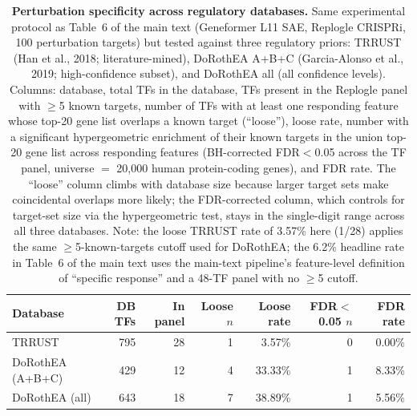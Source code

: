 \documentclass[onecolumn]{article}
\begin{document}
\begin{table}[H]
\centering
\caption{\textbf{Perturbation specificity across regulatory databases.} Same experimental protocol as Table~6 of the main text (Geneformer L11 SAE, Replogle CRISPRi, 100 perturbation targets) but tested against three regulatory priors: TRRUST (Han et al., 2018; literature-mined), DoRothEA A+B+C (Garcia-Alonso et al., 2019; high-confidence subset), and DoRothEA all (all confidence levels). Columns: database, total TFs in the database, TFs present in the Replogle panel with $\geq$5 known targets, number of TFs with at least one responding feature whose top-20 gene list overlaps a known target (``loose''), loose rate, number with a significant hypergeometric enrichment of their known targets in the union top-20 gene list across responding features (BH-corrected FDR$<$0.05 across the TF panel, universe $=$ 20,000 human protein-coding genes), and FDR rate. The ``loose'' column climbs with database size because larger target sets make coincidental overlaps more likely; the FDR-corrected column, which controls for target-set size via the hypergeometric test, stays in the single-digit range across all three databases. Note: the loose TRRUST rate of 3.57\% here (1/28) applies the same $\geq$5-known-targets cutoff used for DoRothEA; the 6.2\% headline rate in Table~6 of the main text uses the main-text pipeline's feature-level definition of ``specific response'' and a 48-TF panel with no $\geq$5 cutoff.}
\label{tab:regulatory_dbs}
\smallskip
\small
\begin{tabular}{lrrrrrr}
\toprule
Database & DB TFs & In panel & Loose $n$ & Loose rate & FDR$<$0.05 $n$ & FDR rate \\
\midrule
TRRUST           & 795 & 28 & 1 & 3.57\% & 0 & 0.00\% \\
DoRothEA (A+B+C) & 429 & 12 & 4 & 33.33\% & 1 & 8.33\% \\
DoRothEA (all)   & 643 & 18 & 7 & 38.89\% & 1 & 5.56\% \\
\bottomrule
\end{tabular}
\end{table}
\end{document}

